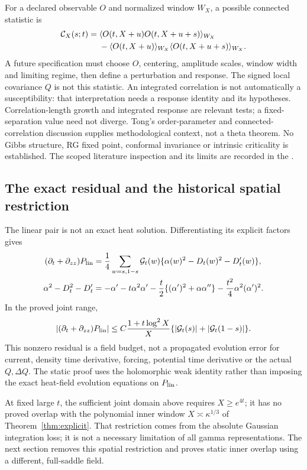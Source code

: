 For a declared observable $O$ and normalized window $W_X$, a possible
connected statistic is
\begin{align}
 \mathcal C_X(s;t)={}&\langle O(t,X+u)O(t,X+u+s)\rangle_{W_X}\notag\\
 &-\langle O(t,X+u)\rangle_{W_X}
           \langle O(t,X+u+s)\rangle_{W_X}.
 \label{eq:connected-outlook}
\end{align}
A future specification must choose $O$, centering, amplitude scales,
window width and limiting regime, then define a perturbation and response.
The signed local covariance $Q$ is not this statistic. An integrated
correlation is not automatically a susceptibility: that interpretation
needs a response identity and its hypotheses. Correlation-length growth
and integrated response are relevant tests; a fixed-separation value need
not diverge. Tong's order-parameter and connected-correlation discussion
\cite{tong} supplies methodological context, not a theta theorem.
No Gibbs structure, RG fixed point, conformal invariance or intrinsic
criticality is established. The scoped literature inspection and its
limits are recorded in the
.

\subsection{The exact residual and the historical spatial restriction}
The linear pair is not an exact heat solution.  Differentiating its
explicit factors gives
\begin{align}
 (\partial_t+\partial_{zz})P_{\rm lin}
 &=\frac14\sum_{w=s,1-s}\mathcal G_t(w)
       \{\alpha(w)^2-D_t(w)^2-D_t'(w)\},\notag\\
 \alpha^2-D_t^2-D_t'
 &=-\alpha'-t\alpha^2\alpha'
       -\frac t2\{(\alpha')^2+\alpha\alpha''\}
       -\frac{t^2}4\alpha^2(\alpha')^2.
 \label{eq:linear-heat-residual}
\end{align}
In the proved joint range,
\begin{equation}
 |(\partial_t+\partial_{zz})P_{\rm lin}|
 \le C\frac{1+t\log^2X}{X}
        \{ |\mathcal G_t(s)|+|\mathcal G_t(1-s)|\}.
 \label{eq:linear-heat-residual-bound}
\end{equation}
This nonzero residual is a field budget, not a propagated evolution
error for current, density time derivative, forcing, potential time
derivative or the actual $Q,\Delta Q$.  The static proof uses the
holomorphic weak identity rather than imposing the exact heat-field
evolution equations on $P_{\rm lin}$.

At fixed large $t$, the sufficient joint domain above requires
$X\ge e^{4t}$; it has no proved overlap with the polynomial inner
window $X\asymp\kappa^{1/3}$ of Theorem~\ref{thm:explicit}.
That restriction comes from the absolute Gaussian integration loss;
it is not a necessary limitation of all gamma representations.
The next section removes this spatial restriction and proves static
inner overlap using a different, full-saddle field.
